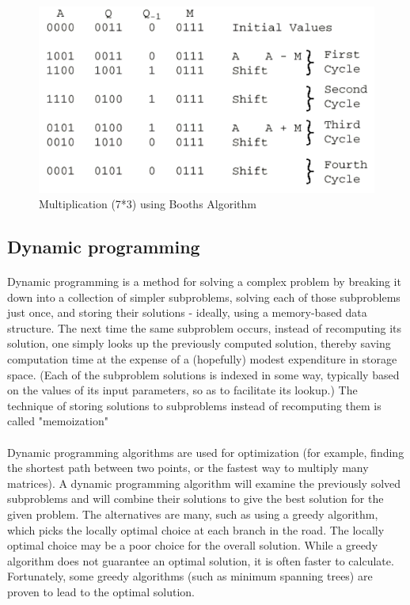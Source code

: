 \documentclass[a4paper,12pt]{article}
\begin{document}
			\begin{figure}[htb]
			
			\centering
			\includegraphics[scale = 0.60]{boothex}
			\caption{ Multiplication (7*3) using Booths Algorithm}
		\end{figure}
\newpage

\subsection{Dynamic programming}
		\paragraph{} Dynamic programming is a method for solving a complex problem by breaking it down into a collection of simpler subproblems, solving each of those subproblems just once, and storing their solutions - ideally, using a memory-based data structure. The next time the same subproblem occurs, instead of recomputing its solution, one simply looks up the previously computed solution, thereby saving computation time at the expense of a (hopefully) modest expenditure in storage space. (Each of the subproblem solutions is indexed in some way, typically based on the values of its input parameters, so as to facilitate its lookup.) The technique of storing solutions to subproblems instead of recomputing them is called "memoization"
		\paragraph{} Dynamic programming algorithms are used for optimization (for example, finding the shortest path between two points, or the fastest way to multiply many matrices). A dynamic programming algorithm will examine the previously solved subproblems and will combine their solutions to give the best solution for the given problem. The alternatives are many, such as using a greedy algorithm, which picks the locally optimal choice at each branch in the road. The locally optimal choice may be a poor choice for the overall solution. While a greedy algorithm does not guarantee an optimal solution, it is often faster to calculate. Fortunately, some greedy algorithms (such as minimum spanning trees) are proven to lead to the optimal solution.
		
\end{document}
